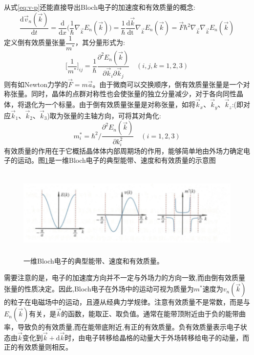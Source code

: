 从式\eqref{eq:v-p}还能直接导出Bloch电子的加速度和有效质量的概念:
\begin{equation}
	\dfrac{\mathrm{d}\vec v_n(\vec k)}{\mathrm{d}t}=\dfrac{\mathrm{d}}{\mathrm{d}x}\bigg(\dfrac1{\hbar}\nabla_{\vec k} E_n(\vec k)\bigg)=\dfrac1{\hbar}\dfrac{\mathrm{d}\vec k}{\mathrm{dt}}\nabla_{\vec k}E_n(\vec k)=\vec F\hbar^2\nabla_{\vec k}\nabla_{\vec k}E_n(\vec k)
	\label{eq:electron-additi}
\end{equation}
定义倒有效质量张量$\dfrac1{m^{\ast}}$，其分量形式为:
\begin{equation}
	\bigg[\dfrac1{m^{\ast}}\bigg]_{ij}=\dfrac1{\hbar}\dfrac{\partial^2E_n(\vec k)}{\partial\vec k_i\partial\vec k_j}\quad(i,j,k=1,2,3)
	\label{eq:effective-mass_inverse}
\end{equation}
则有如Newton力学的$\vec F=m\vec a$。由于微商可以交换顺序，倒有效质量张量是一个对称张量。同时，晶体的点群对称性也会使张量的独立分量减少，对于各向同性晶体，将退化为一个标量。由于倒有效质量张量是对称张量，如将$\vec k_x$、$\vec k_y$、$\vec k_z$:(即对应$\vec k_1$、$\vec k_2$、$\vec k_3$)取为张量的主轴方向，可将其对角化:
\begin{equation}
	m_i^{\ast}=\hbar^2/\dfrac{\partial^2 E_n(\vec k)}{\partial k_i^2}\quad(i=1,2,3)
	\label{eq:effective-mass}
\end{equation}
有效质量的作用在于它概括晶体体内部周期场的作用，能够简单地由外场力确定电子的运动。图\ref{Fig:E-V-mass}是一维Bloch电子的典型能带、速度和有效质量的示意图
\begin{figure}[h!]
\centering
\vspace*{-0.10in}
\includegraphics[height=1.75in,width=4.80in,viewport=0 0 90 30,clip]{Figures/E-v-mass.png}
\caption{\small \textrm{一维Bloch电子的典型能带、速度和有效质量。}}%
\label{Fig:E-V-mass}
\end{figure}

需要注意的是，电子的加速度方向并不一定与外场力的方向一致,而由倒有效质量张量的性质决定。因此,Bloch电子在外场中的运动可视为质量为$m^{\ast}$速度为$v_n(\vec k)$的粒子在电磁场中的运动，且遵从经典力学规律。注意有效质量不是常数，而是与$E_n(\vec k)$有关，是$\vec k$的函数，能取正、取负值。通常在能带顶附近由于负的能带曲率，导致负的有效质量,而在能带底附近,有正的有效质量。负有效质量表示电子状态由$\vec k$变化到$\vec k+\mathrm{d}\vec k$时，由电子转移给晶格的动量大于外场转移给电子的动量，而正的有效质量则相反。

